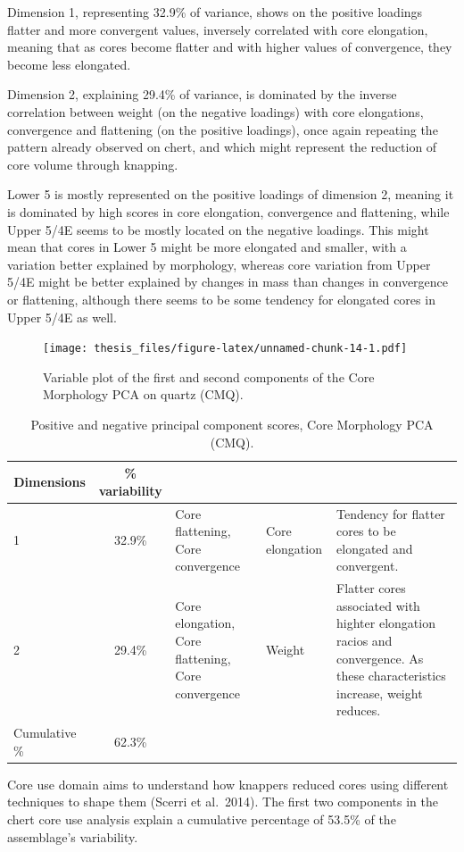 \documentclass[12pt,twoside]{reedthesis}
\begin{document}
Dimension 1, representing 32.9\% of variance, shows on the positive loadings flatter and more convergent values, inversely correlated with core elongation, meaning that as cores become flatter and with higher values of convergence, they become less elongated.

Dimension 2, explaining 29.4\% of variance, is dominated by the inverse correlation between weight (on the negative loadings) with core elongations, convergence and flattening (on the positive loadings), once again repeating the pattern already observed on chert, and which might represent the reduction of core volume through knapping.

Lower 5 is mostly represented on the positive loadings of dimension 2, meaning it is dominated by high scores in core elongation, convergence and flattening, while Upper 5/4E seems to be mostly located on the negative loadings. This might mean that cores in Lower 5 might be more elongated and smaller, with a variation better explained by morphology, whereas core variation from Upper 5/4E might be better explained by changes in mass than changes in convergence or flattening, although there seems to be some tendency for elongated cores in Upper 5/4E as well.
\begin{figure}
\centering
\texttt{[image: thesis\_files/figure-latex/unnamed-chunk-14-1.pdf]}
\caption{\label{fig:unnamed-chunk-14}Variable plot of the first and second components of the Core Morphology PCA on quartz (CMQ).}
\end{figure}
\begin{table}[!h]

\caption{\label{tab:unnamed-chunk-15}Positive and negative principal component scores, Core Morphology PCA (CMQ).}
\centering
\begin{tabular}[t]{lc>{\raggedright\arraybackslash}p{3cm}>{\raggedright\arraybackslash}p{3cm}>{\raggedright\arraybackslash}p{3cm}}
\toprule
\multicolumn{1}{c}{\textbf{Dimensions}} & \multicolumn{1}{c}{\textbf{\% variability}} & \multicolumn{1}{>{\centering\arraybackslash}p{3cm}}{\textbf{+}} & \multicolumn{1}{>{\centering\arraybackslash}p{3cm}}{\textbf{-}} & \multicolumn{1}{>{\centering\arraybackslash}p{3cm}}{\textbf{Interpretation}}\\
\midrule
1 & 32.9\% & Core flattening, Core convergence & Core elongation & Tendency for flatter cores to be elongated and convergent.\\
2 & 29.4\% & Core elongation, Core flattening, Core convergence & Weight & Flatter cores associated with highter elongation racios and convergence. As these characteristics increase, weight reduces.\\
Cumulative \% & 62.3\% &  &  & \\
\bottomrule
\end{tabular}
\end{table}
Core use domain aims to understand how knappers reduced cores using different techniques to shape them (Scerri et al.~2014). The first two components in the chert core use analysis explain a cumulative percentage of 53.5\% of the assemblage's variability.
\end{document}
